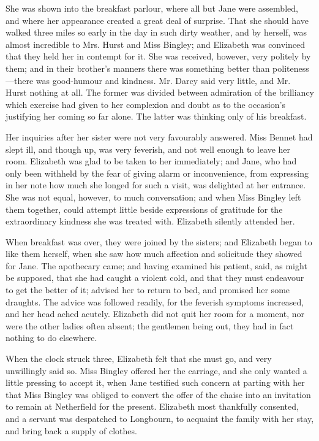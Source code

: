 \documentclass[12pt]{book}
\begin{document}
She was shown into the breakfast parlour, where all but Jane were assembled, and where her appearance created a great deal of surprise. That she should have walked three miles so early in the day in such dirty weather, and by herself, was almost incredible to Mrs. Hurst and Miss Bingley; and Elizabeth was convinced that they held her in contempt for it. She was received, however, very politely by them; and in their brother's manners there was something better than politeness---there was good-humour and kindness. Mr. Darcy said very little, and Mr. Hurst nothing at all. The former was divided between admiration of the brilliancy which exercise had given to her complexion and doubt as to the occasion's justifying her coming so far alone. The latter was thinking only of his breakfast.

Her inquiries after her sister were not very favourably answered. Miss Bennet had slept ill, and though up, was very feverish, and not well enough to leave her room. Elizabeth was glad to be taken to her immediately; and Jane, who had only been withheld by the fear of giving alarm or inconvenience, from expressing in her note how much she longed for such a visit, was delighted at her entrance. She was not equal, however, to much conversation; and when Miss Bingley left them together, could attempt little beside expressions of gratitude for the extraordinary kindness she was treated with. Elizabeth silently attended her.

When breakfast was over, they were joined by the sisters; and Elizabeth began to like them herself, when she saw how much affection and solicitude they showed for Jane. The apothecary came; and having examined his patient, said, as might be supposed, that she had caught a violent cold, and that they must endeavour to get the better of it; advised her to return to bed, and promised her some draughts. The advice was followed readily, for the feverish symptoms increased, and her head ached acutely. Elizabeth did not quit her room for a moment, nor were the other ladies often absent; the gentlemen being out, they had in fact nothing to do elsewhere.

When the clock struck three, Elizabeth felt that she must go, and very unwillingly said so. Miss Bingley offered her the carriage, and she only wanted a little pressing to accept it, when Jane testified such concern at parting with her that Miss Bingley was obliged to convert the offer of the chaise into an invitation to remain at Netherfield for the present. Elizabeth most thankfully consented, and a servant was despatched to Longbourn, to acquaint the family with her stay, and bring back a supply of clothes.
\end{document}
